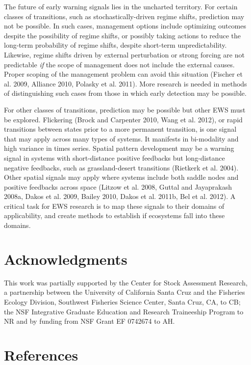 \documentclass{article}
\begin{document}
The future of early warning signals lies in the uncharted territory. For
certain classes of transitions, such as stochastically-driven regime
shifts, prediction may not be possible. In such cases, management
options include optimizing outcomes despite the possibility of regime
shifts, or possibly taking actions to reduce the long-term probability
of regime shifts, despite short-term unpredictability. Likewise, regime
shifts driven by external perturbation or strong forcing are not
predictable \emph{if} the scope of management does not include the
external causes. Proper scoping of the management problem can avoid this
situation (Fischer et al. 2009, Alliance 2010, Polasky et al. 2011).
More research is needed in methods of distinguishing such cases from
those in which early detection may be possible.

For other classes of transitions, prediction may be possible but other
EWS must be explored. Flickering (Brock and Carpenter 2010, Wang et al.
2012), or rapid transitions between states prior to a more permanent
transition, is one signal that may apply across many types of systems.
It manifests in bi-modality and high variance in times series. Spatial
pattern development may be a warning signal in systems with
short-distance positive feedbacks but long-distance negative feedbacks,
such as grassland-desert transitions (Rietkerk et al. 2004). Other
spatial signals may apply where systems include both saddle nodes and
positive feedbacks across space (Litzow et al. 2008, Guttal and
Jayaprakash 2008a, Dakos et al. 2009, Bailey 2010, Dakos et al. 2011b,
Bel et al. 2012). A critical task for EWS research is to map these
signals to their domains of applicability, and create methods to
establish if ecosystems fall into these domains.

\section{Acknowledgments}

This work was partially supported by the Center for Stock Assessment
Research, a partnership between the University of California Santa Cruz
and the Fisheries Ecology Division, Southwest Fisheries Science Center,
Santa Cruz, CA, to CB; the NSF Integrative Graduate Education and
Research Traineeship Program to NR and by funding from NSF Grant EF
0742674 to AH.

\section{References}
\end{document}
